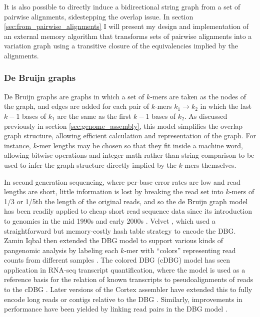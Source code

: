 \documentclass[a4paper,12pt,numbered,oneside]{Classes/PhDThesisPSnPDF}
\begin{document}
It is also possible to directly induce a bidirectional string graph from a set of pairwise alignments, sidestepping the overlap issue.
In section \ref{sec:from_pairwise_alignments} I will present my design and implementation of an external memory algorithm that transforms sets of pairwise alignments into a variation graph using a transitive closure of the equivalencies implied by the alignments.

\subsubsection{De Bruijn graphs}
\label{sec:de_bruijn_graphs}

De Bruijn graphs \cite{de1946combinatorial} are graphs in which a set of $k$-mers are taken as the nodes of the graph, and edges are added for each pair of $k$-mers $k_1 \rightarrow k_2$ in which the last $k-1$ bases of $k_1$ are the same as the first $k-1$ bases of $k_2$.
As discussed previously in section \ref{sec:genome_assembly}, this model simplifies the overlap graph structure, allowing efficient calculation and representation of the graph.
For instance, $k$-mer lengths may be chosen so that they fit inside a machine word, allowing bitwise operations and integer math rather than string comparison to be used to infer the graph structure directly implied by the $k$-mers themselves.

In second generation sequencing, where per-base error rates are low and read lengths are short, little information is lost by breaking the read set into $k$-mers of 1/3 or 1/5th the length of the original reads, and so the de Bruijn graph model has been readily applied to cheap short read sequence data since its introduction to genomics in the mid 1990s and early 2000s \cite{idury1995new,pevzner2001eulerian}.
Velvet \cite{zerbino2008velvet}, which used a straightforward but memory-costly hash table strategy to encode the DBG.
Zamin Iqbal then extended the DBG model to support various kinds of pangenomic analysis by labeling each $k$-mer with ``colors'' representing read counts from different samples \cite{iqbal2012novo}.
The colored DBG (cDBG) model has seen application in RNA-seq transcript quantification, where the model is used as a reference basis for the relation of known transcripts to pseudoalignments of reads to the cDBG \cite{bray2016near}.
Later versions of the Cortex assembler have extended this to fully encode long reads or contigs relative to the DBG \cite{turner2018integrating}.
Similarly, improvements in performance have been yielded by linking read pairs in the DBG model \cite{bankevich2012spades}.
\end{document}
